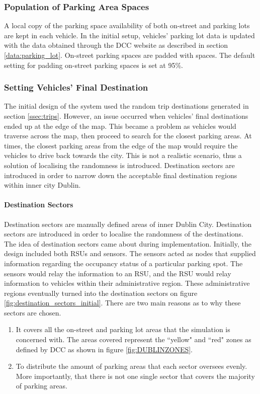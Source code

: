 \subsubsection{Population of Parking Area Spaces}
A local copy of the parking space availability of both on-street and parking lots are kept in each vehicle. In the initial setup, vehicles' parking lot data is updated with the data obtained through the \ac{DCC} website as described in section \ref{data:parking_lot}. On-street parking spaces are padded with spaces. The default setting for padding on-street parking spaces is set at 95\%.

\subsubsection{Setting Vehicles' Final Destination}
The initial design of the system used the random trip destinations generated in section \ref{ssec:trips}. However, an issue occurred when vehicles' final destinations ended up at the edge of the map. This became a problem as vehicles would traverse across the map, then proceed to search for the closest parking areas. At times, the closest parking areas from the edge of the map would require the vehicles to drive back towards the city. This is not a realistic scenario, thus a solution of localising the randomness is introduced. Destination sectors are introduced in order to narrow down the acceptable final destination regions within inner city Dublin.

\paragraph{Destination Sectors}
Destination sectors are manually defined areas of inner Dublin City. Destination sectors are introduced in order to localise the randomness of the destinations. The idea of destination sectors came about during implementation. Initially, the design included both \ac{RSUs} and sensors. The sensors acted as nodes that supplied information regarding the occupancy status of a particular parking spot. The sensors would relay the information to an \ac{RSU}, and the \ac{RSU} would relay information to vehicles within their administrative region. These administrative regions eventually turned into the destination sectors on figure \ref{fig:destination_sectors_initial}. There are two main reasons as to why these sectors are chosen.

\begin{enumerate}
    \item It covers all the on-street and parking lot areas that the simulation is concerned with. The areas covered represent the ``yellow" and ``red" zones as defined by DCC as shown in figure \ref{fig:DUBLINZONES}.
    \item To distribute the amount of parking areas that each sector oversees evenly. More importantly, that there is not one single sector that covers the majority of parking areas.
\end{enumerate}

